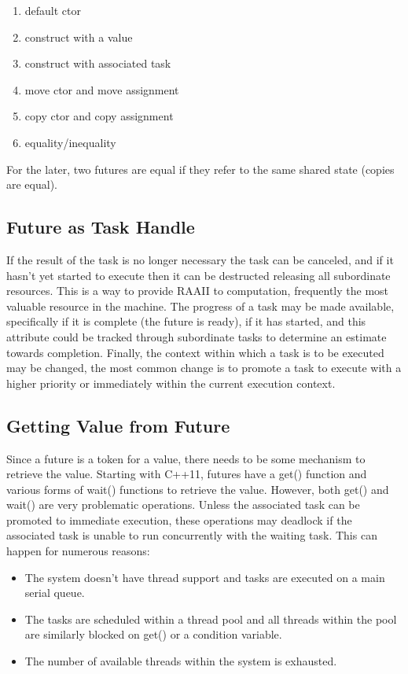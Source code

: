 \begin{enumerate}
\item default ctor
\item construct with a value
\item construct with associated task
\item move ctor and move assignment
\item copy ctor and copy assignment
\item equality/inequality
\end{enumerate}

For the later, two futures are equal if they refer to the same shared state (copies are equal).

\subsection{Future as Task Handle}

If the result of the task is no longer necessary the task can be canceled, and if it hasn’t yet started to execute then it can be destructed releasing all subordinate resources. This is a way to provide RAAII to computation, frequently the most valuable resource in the machine. The progress of a task may be made available, specifically if it is complete (the future is ready), if it has started, and this attribute could be tracked through subordinate tasks to determine an estimate towards completion. Finally, the context within which a task is to be executed may be changed, the most common change is to promote a task to execute with a higher priority or immediately within the current execution context.

\subsection{Getting Value from Future}

Since a future is a token for a value, there needs to be some mechanism to retrieve the value. Starting with C++11, futures have a get() function and various forms of wait() functions to retrieve the value. However, both get() and wait() are very problematic operations. Unless the associated task can be promoted to immediate execution, these operations may deadlock if the associated task is unable to run concurrently with the waiting task. This can happen for numerous reasons:

\begin{itemize}
\item The system doesn’t have thread support and tasks are executed on a main serial queue.
\item The tasks are scheduled within a thread pool and all threads within the pool are similarly blocked on get() or a condition variable.
\item The number of available threads within the system is exhausted.
\end{itemize}

